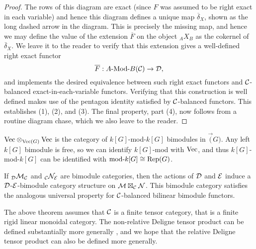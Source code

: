 \documentclass{amsart}
\begin{document}
\begin{proof}
The rows of this diagram are exact (since $F$ was assumed to be right exact in each variable) and hence this diagram defines a unique map $\overline{\delta}_X$, shown as the long dashed arrow in the diagram. This is precisely the missing map, and hence we may define the value of the extension $\overline{F}$ on the object ${}_AX_B$ as the cokernel of $\overline{\delta}_X$. We leave it to the reader to verify that this extension gives a well-defined right exact functor 
\begin{equation*}
	\overline{F}: \Mod{A}{B}(\cC) \to \cD,
\end{equation*} 
and implements the desired equivalence between such right exact functors and $\cC$-balanced exact-in-each-variable functors. Verifying that this construction is well defined makes use of the pentagon identity satisfied by $\cC$-balanced functors. This establishes (1), (2), and (3). The final property, part (4), now follows from a routine diagram chase, which we also leave to the reader. 
\end{proof}

\begin{example}
$\Vec \otimes_{\Vec(G)} \Vec$ is the category of $k[G]$-mod-$k[G]$ bimodules in $\Vec(G)$. Any left $k[G]$ bimodule is free, so we can identify $k[G]$-mod with $\Vec$, and thus $k[G]$-mod-$k[G]$ can be identified with $\text{mod-}k[G] \cong \Rep(G)$.
\end{example}

\begin{remark}
	If ${}_{\cD}\cM_{\cC}$ and ${}_{\cC}\cN_{\cE}$ are bimodule categories, then the actions of $\cD$ and $\cE$ induce a $\cD$-$\cE$-bimodule category structure on $\cM \boxtimes_{\cC} \cN$. This bimodule category satisfies the analogous universal property for $\cC$-balanced bilinear bimodule functors.   
\end{remark}

\begin{remark}
The above theorem assumes that $\cC$ is a finite tensor category, that is a finite rigid linear monoidal category.  The non-relative Deligne tensor product can be defined substantially more generally \cite{1212.1545}, and we hope that the relative Deligne tensor product can also be defined more generally.
\end{remark}














\end{document}
